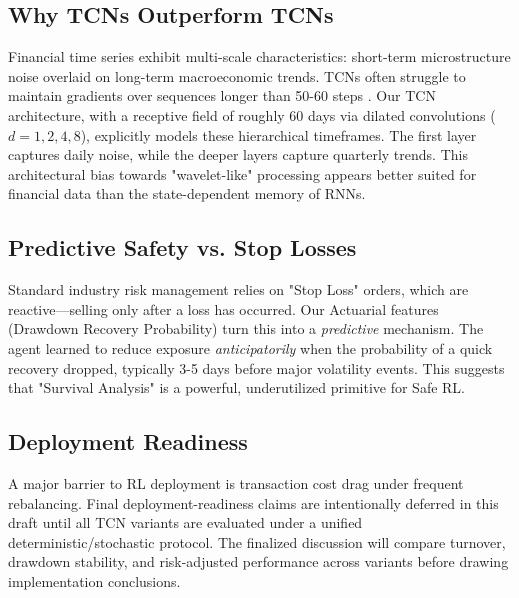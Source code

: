 \subsection{Why TCNs Outperform TCNs}
Financial time series exhibit multi-scale characteristics: short-term microstructure noise overlaid on long-term macroeconomic trends. TCNs often struggle to maintain gradients over sequences longer than 50-60 steps \citep{bai2018tcn}. Our TCN architecture, with a receptive field of roughly 60 days via dilated convolutions ($d=1,2,4,8$), explicitly models these hierarchical timeframes. The first layer captures daily noise, while the deeper layers capture quarterly trends. This architectural bias towards "wavelet-like" processing appears better suited for financial data than the state-dependent memory of RNNs.

\subsection{Predictive Safety vs. Stop Losses}
Standard industry risk management relies on "Stop Loss" orders, which are reactive—selling only after a loss has occurred. Our Actuarial features (Drawdown Recovery Probability) turn this into a \textit{predictive} mechanism. The agent learned to reduce exposure \textit{anticipatorily} when the probability of a quick recovery dropped, typically 3-5 days before major volatility events. This suggests that "Survival Analysis" is a powerful, underutilized primitive for Safe RL.

\subsection{Deployment Readiness}
A major barrier to RL deployment is transaction cost drag under frequent rebalancing.
Final deployment-readiness claims are intentionally deferred in this draft until all TCN variants are evaluated under a unified deterministic/stochastic protocol.
The finalized discussion will compare turnover, drawdown stability, and risk-adjusted performance across variants before drawing implementation conclusions.

